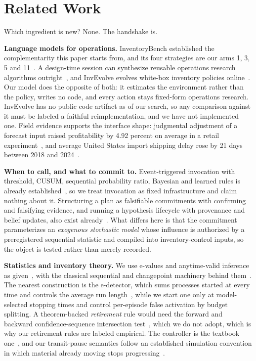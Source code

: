 \section{Related Work}
\label{sec:related}

Which ingredient is new? None. The handshake is.

\textbf{Language models for operations.} InventoryBench established the
complementarity this paper starts from, and its four strategies are our arms 1,
3, 5 and 11~\cite{inventorybench}. A design-time session can synthesize reusable
operations research algorithms outright~\cite{llm-or-algorithms}, and InvEvolve
evolves white-box inventory policies online~\cite{invevolve}. Our model does the
opposite of both: it estimates the environment rather than the policy, writes no
code, and every action stays fixed-form operations research. InvEvolve has no
public code artifact as of our search, so any comparison against it must be
labeled a faithful reimplementation, and we have not implemented one. Field
evidence supports the interface shape: judgmental adjustment of a forecast input
raised profitability by 4.92 percent on average in a retail
experiment~\cite{kesavan-field}, and average United States import shipping delay
rose by 21 days between 2018 and 2024~\cite{carreras-valle-delays}.

\textbf{When to call, and what to commit to.} Event-triggered invocation with
threshold, CUSUM, sequential probability ratio, Bayesian and learned rules is
already established~\cite{event-triggered-llm}, so we treat invocation as fixed
infrastructure and claim nothing about it. Structuring a plan as falsifiable commitments with confirming
and falsifying evidence, and running a hypothesis lifecycle with provenance and
belief updates, also exist already~\cite{fcpagent, hep}. What differs here is
that the commitment parameterizes an \emph{exogenous stochastic model} whose
influence is authorized by a preregistered sequential statistic and compiled into
inventory-control inputs, so the object is tested rather than merely recorded.

\textbf{Statistics and inventory theory.} We use e-values and anytime-valid
inference as given~\cite{vovk-wang-evalues, ramdas-savi}, with the classical
sequential and changepoint machinery behind them~\cite{ville, page-cusum}. The
nearest construction is the e-detector, which sums
processes started at every time and controls the average run
length~\cite{e-detectors}, while we start one only at model-selected stopping
times and control per-episode false activation by budget splitting. A theorem-backed
\emph{retirement} rule would need the forward and backward confidence-sequence
intersection test~\cite{shekhar-backward-cs}, which we do not adopt, which is why
our retirement rules are labeled empirical. The controller is the textbook
one~\cite{clark-scarf}, and our transit-pause semantics follow an established
simulation convention in which material already moving stops
progressing~\cite{stockpyl}.
